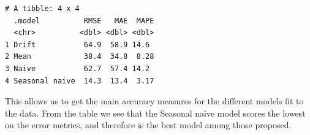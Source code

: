 \documentclass[
  letterpaper,
  DIV=11,
  numbers=noendperiod]{scrartcl}
\begin{document}
\begin{verbatim}
# A tibble: 4 x 4
  .model          RMSE   MAE  MAPE
  <chr>          <dbl> <dbl> <dbl>
1 Drift           64.9  58.9 14.6 
2 Mean            38.4  34.8  8.28
3 Naive           62.7  57.4 14.2 
4 Seasonal naive  14.3  13.4  3.17
\end{verbatim}

This allows us to get the main accuracy measures for the different
models fit to the data. From the table we see that the Seasonal naive
model scores the lowest on the error metrics, and therefore is the best
model among those proposed.
\end{document}
